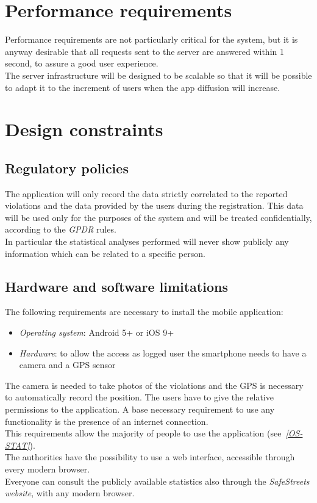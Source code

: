 \documentclass[a4paper]{report}
\begin{document}
\section{Performance requirements}
Performance requirements are not particularly critical for the system, but it is anyway desirable that all requests sent to the server are answered within 1 second, to assure a good user experience. \\
The server infrastructure will be designed to be scalable so that it will be possible to adapt it to the increment of users when the app diffusion will increase.
\section{Design constraints}
\subsection{Regulatory policies}
The application will only record the data strictly correlated to the reported violations and the data provided by the users during the registration. This data will be used only for the purposes of the system and will be treated confidentially, according to the \textit{GPDR} rules.\\
In particular the statistical analyses performed will never show publicly any information which can be related to a specific person.
\subsection{Hardware and software limitations}
The following requirements are necessary to install the mobile application:
\begin{itemize}
\item \textit{Operating system}: Android 5+ or iOS 9+
\item \textit{Hardware}: to allow the access as logged user the smartphone needs to have a camera and a GPS sensor
\end{itemize}
The camera is needed to take photos of the violations and the GPS is necessary to automatically record the position. The users have to give the relative permissions to the application. A base necessary requirement to use any functionality is the presence of an internet connection.\\
This requirements allow the majority of people to use the application \label{use:os-stats}  \mbox{(see \hyperref[ref:os-stats]{\textit{[OS-STAT]}}).}\\
The authorities have the possibility to use a web interface, accessible through every modern browser.\\
Everyone can consult the publicly available statistics also through the \textit{SafeStreets website}, with any modern browser.
\end{document}
